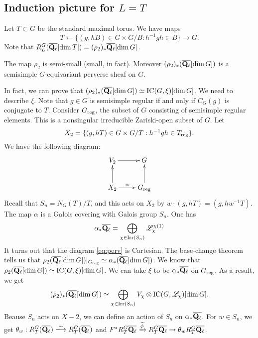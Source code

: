 \documentclass{article}
\begin{document}
\subsection{Induction picture for \texorpdfstring{$L=T$}{L=T}}

Let $T\subset G$ be the standard maximal torus. We have maps 
\[
  T \leftarrow \{(g,h B)\in G\times G/B:h^{-1} g h \in B\} \to G .
\]
Note that 
$R_L^G(\overline{\mathbf{Q}_\ell}[\dim T]) = (\rho_2)_\ast \overline{\mathbf{Q}_\ell}[\dim G]$. 

\begin{theorem}
The map $\rho_2$ is semi-small (small, in fact). Moreover 
$(\rho_2)_\ast (\overline{\mathbf{Q}_\ell}[\dim G])$ is a semisimple $G$-equivariant 
perverse sheaf on $G$. 
\end{theorem}

In fact, we can prove that 
$(\rho_2)_\ast (\overline{\mathbf{Q}_\ell}[\dim G]) \simeq \operatorname{IC}(G,\xi)[\dim G]$. 
We need to describe $\xi$. Note that $g\in G$ is semisimple regular if and only if 
$C_G(g)$ is conjugate to $T$. Consider $G_{\mathrm{reg}}$, the subset of $G$ consisting 
of semisimple regular elements. This is a nonsingular irreducible Zariski-open 
subset of $G$. Let 
\[
  X_2 = \{(g, h T)\in G\times G/T:h^{-1} g h\in T_{\mathrm{reg}}\} .
\]
We have the following diagram: 
\begin{equation}\label{eq:perv}
\xymatrix{
  V_2 \ar[r] 
    & G \\
  X_2 \ar[r]^-\alpha \ar[u] 
    & G_\regular \ar[u] .
}
\end{equation}
Recall that $S_n=N_G(T)/T$, and this acts on $X_2$ by 
$w\cdot (g, h T) = (g, h w^{-1} T)$. The map $\alpha$ is a Galois covering 
with Galois group $S_n$. One has 
\[
  \alpha_\ast \overline{\mathbf{Q}_\ell} = \bigoplus_{\chi\in \operatorname{Irr}(S_n)}\mathscr{L}_\chi^{\chi(1)}
\]
It turns out that the diagram \eqref{eq:perv} is Cartesian. The base-change 
theorem tells us that 
$\rho_2(\overline{\mathbf{Q}_\ell}[\dim G])|_{G_{\mathrm{reg}}} \simeq \alpha_\ast (\overline{\mathbf{Q}_\ell}[\dim G])$. We know that 
$\rho_2(\overline{\mathbf{Q}_\ell}[\dim G]) \simeq \operatorname{IC}(G,\xi)[\dim G]$. 
We can take $\xi$ to be $\alpha_\ast \overline{\mathbf{Q}_\ell}$ on 
$G_{\mathrm{reg}}$. As a result, we get 
\[
  (\rho_2)_\ast (\overline{\mathbf{Q}_\ell}[\dim G]) \simeq \bigoplus_{\chi\in \operatorname{Irr}(S_n)} V_\chi \otimes \operatorname{IC}(G,\mathscr{L}_\chi)[\dim G] .
\]
Beause $S_n$ acts on $X-2$, we can define an action of $S_n$ on 
$\alpha_\ast \overline{\mathbf{Q}_\ell}$. For $w\in S_n$, we get 
$\theta_w:R_T^G(\overline{\dQ_\ell}) \isomorphism R_T^G(\overline{\dQ_\ell})$ 
and $F^\ast R_T^G\overline{\mathbf{Q}_\ell} \xrightarrow{\widetilde\phi} R_T^G\overline{\mathbf{Q}_\ell} \rightarrow{\theta_w} R_T^G\overline{\mathbf{Q}_\ell}$. 
\end{document}
